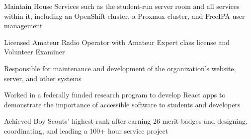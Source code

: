\vspace{2pt plus 1pt minus 1pt}


\smallskip
\smallskip


\medskip


\medskip


Maintain House Services such as the student-run server room and all services within it, including an OpenShift cluster, a Proxmox cluster, and FreeIPA user management

\divider

Licensed Amateur Radio Operator with Amateur Expert class license and Volunteer Examiner

\divider

Responsible for maintenance and development of the organization's website, server, and other systems

\divider

Worked in a federally funded research program to develop React apps to demonstrate the importance of accessible software to students and developers

\divider

Achieved Boy Scouts' highest rank after earning 26 merit badges and designing, coordinating, and leading a 100+ hour service project


